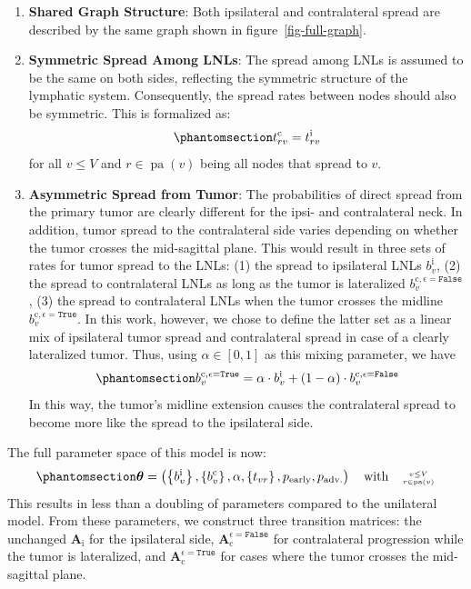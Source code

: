 \documentclass[
  sn-mathphys-num,
]{sn-jnl}
\providecommand{\tightlist}{%
  \setlength{\itemsep}{0pt}\setlength{\parskip}{0pt}}\usepackage{longtable,booktabs,array}
\begin{document}
\begin{enumerate}
\def\labelenumi{\arabic{enumi}.}
\tightlist
\item
  \textbf{Shared Graph Structure}: Both ipsilateral and contralateral
  spread are described by the same graph shown in
  figure~\ref{fig-full-graph}.
\item
  \textbf{Symmetric Spread Among LNLs}: The spread among LNLs is assumed
  to be the same on both sides, reflecting the symmetric structure of
  the lymphatic system. Consequently, the spread rates between nodes
  should also be symmetric. This is formalized as:\\
  \begin{equation}\phantomsection\label{eq-symmetries}{
    t_{rv}^\text{c} = t_{rv}^\text{i}
    }\end{equation} for all \(v \leq V\) and
  \(r \in \operatorname{pa}(v)\) being all nodes that spread to \(v\).
\item
  \textbf{Asymmetric Spread from Tumor}: The probabilities of direct
  spread from the primary tumor are clearly different for the ipsi- and
  contralateral neck. In addition, tumor spread to the contralateral
  side varies depending on whether the tumor crosses the mid-sagittal
  plane. This would result in three sets of rates for tumor spread to
  the LNLs: (1) the spread to ipsilateral LNLs \(b^\text{i}_v\), (2) the
  spread to contralateral LNLs as long as the tumor is lateralized
  \(b_v^{\text{c},\epsilon=\texttt{False}}\), (3) the spread to
  contralateral LNLs when the tumor crosses the midline
  \(b_v^{\text{c},\epsilon=\texttt{True}}\). In this work, however, we
  chose to define the latter set as a linear mix of ipsilateral tumor
  spread and contralateral spread in case of a clearly lateralized
  tumor. Thus, using \(\alpha \in [0,1]\) as this mixing parameter, we
  have \begin{equation}\phantomsection\label{eq-mixing}{
    b_v^{\text{c},\epsilon=\texttt{True}} = \alpha \cdot b_v^\text{i} + (1 - \alpha) \cdot b_v^{\text{c},\epsilon=\texttt{False}}
    }\end{equation} In this way, the tumor's midline extension causes
  the contralateral spread to become more like the spread to the
  ipsilateral side.
\end{enumerate}

The full parameter space of this model is now:
%
\begin{equation}\phantomsection\label{eq-bi-param-space}{
\boldsymbol{\theta} = \left( \left\{ b_v^\text{i} \right\}, \left\{ b_v^\text{c} \right\}, \alpha, \left\{ t_{vr} \right\}, p_\text{early}, p_\text{adv.} \right) \quad \text{with} \quad \genfrac{}{}{0pt}{2}{v\leq V}{r\in\operatorname{pa}(v)}
}\end{equation}
%
This results in less than a doubling of parameters compared to the
unilateral model. From these parameters, we construct three transition
matrices: the unchanged \(\mathbf{A}_\text{i}\) for the ipsilateral
side, \(\mathbf{A}_\text{c}^{\epsilon=\texttt{False}}\) for
contralateral progression while the tumor is lateralized, and
\(\mathbf{A}_\text{c}^{\epsilon=\texttt{True}}\) for cases where the
tumor crosses the mid-sagittal plane.
\end{document}
